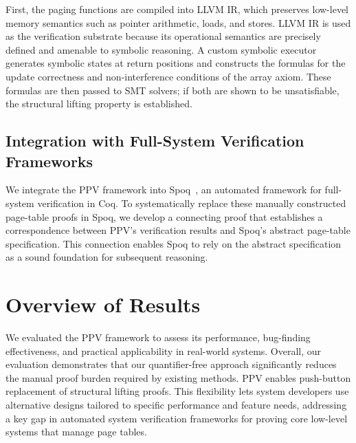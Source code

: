 \documentclass[sigplan,nonacm,10pt]{acmart}
\begin{document}
First, the paging functions are compiled into LLVM IR, which preserves low-level memory semantics such as pointer arithmetic, loads, and stores. LLVM IR is used as the verification substrate because its operational semantics are precisely defined and amenable to symbolic reasoning. A custom symbolic executor generates symbolic states at return positions and constructs the formulas for the update correctness and non-interference conditions of the array axiom. These formulas are then passed to SMT solvers; if both are shown to be unsatisfiable, the structural lifting property is established.

\subsection*{Integration with Full-System Verification Frameworks}
We integrate the PPV framework into Spoq~\cite{spoq}, an automated framework for full-system verification in Coq. To systematically replace these manually constructed page-table proofs in Spoq, we develop a connecting proof that establishes a correspondence between PPV’s verification results and Spoq's abstract page-table specification. This connection enables Spoq to rely on the abstract specification as a sound foundation for subsequent reasoning.

\section*{Overview of Results}
We evaluated the PPV framework to assess its performance, bug-finding effectiveness, and practical applicability in real-world systems. Overall, our evaluation demonstrates that our quantifier-free approach significantly reduces the manual proof burden required by existing methods. %
PPV enables push-button replacement of structural lifting proofs. This flexibility lets system developers use alternative designs tailored to specific performance and feature needs, addressing a key gap in automated system verification frameworks for proving core low-level systems that manage page tables.
\end{document}
